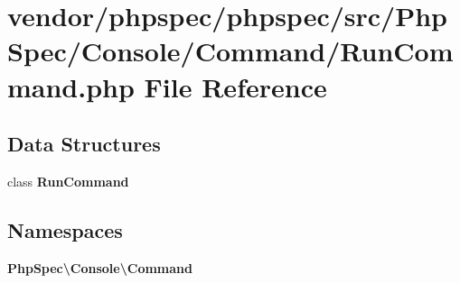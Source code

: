 \section{vendor/phpspec/phpspec/src/\+Php\+Spec/\+Console/\+Command/\+Run\+Command.php File Reference}
\label{_run_command_8php}
\subsection*{Data Structures}
\begin{DoxyCompactItemize}
\item 
class {\bf Run\+Command}
\end{DoxyCompactItemize}
\subsection*{Namespaces}
\begin{DoxyCompactItemize}
\item 
 {\bf Php\+Spec\textbackslash{}\+Console\textbackslash{}\+Command}
\end{DoxyCompactItemize}
